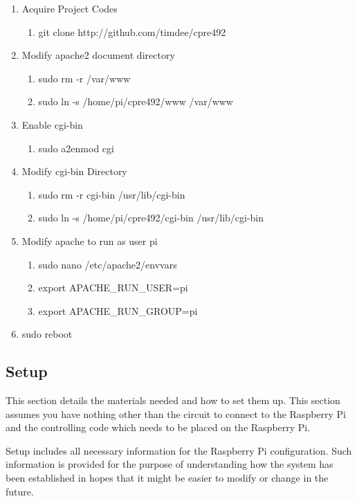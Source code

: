 \documentclass{article}	%
\begin{document}
\begin{multicols}{2}
\begin{enumerate}
\item Acquire Project Codes
    \begin{enumerate}
    \item git clone http://github.com/timdee/cpre492
    \end{enumerate}

\item Modify apache2 document directory
    \begin{enumerate}
    \item sudo rm -r /var/www
    \item sudo ln -s /home/pi/cpre492/www /var/www
    \end{enumerate}

\item Enable cgi-bin
    \begin{enumerate}
    \item sudo a2enmod cgi
    \end{enumerate}

\item Modify cgi-bin Directory
    \begin{enumerate}
    \item sudo rm -r cgi-bin /usr/lib/cgi-bin
    \item sudo ln -s /home/pi/cpre492/cgi-bin /usr/lib/cgi-bin
    \end{enumerate}

\item Modify apache to run as user pi
    \begin{enumerate}
    \item sudo nano /etc/apache2/envvars
    \item export APACHE\_RUN\_USER=pi
    \item export APACHE\_RUN\_GROUP=pi
    \end{enumerate}
\item sudo reboot
\end{enumerate}

\subsection{Setup}
This section details the materials needed and
how to set them up.
This section assumes you have nothing
other than the
circuit to connect to the Raspberry Pi and
the controlling code which needs to be placed on
the Raspberry Pi.

Setup includes all necessary information
for the Raspberry Pi configuration.
Such information is provided
for the purpose of understanding 
how the system has been established
in hopes that it might be easier to modify or
change in the future.


\end{multicols}
\end{document}
